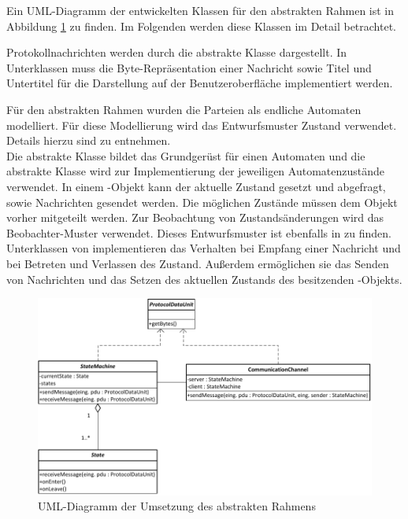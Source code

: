 Ein UML-Diagramm der entwickelten Klassen für den abstrakten Rahmen ist in Abbildung \ref{fig_uml_abstract_state_machine} zu finden. Im Folgenden werden diese Klassen im Detail betrachtet.

Protokollnachrichten werden durch die abstrakte Klasse  dargestellt. In Unterklassen muss die Byte-Repräsentation einer Nachricht sowie Titel und Untertitel für die Darstellung auf der Benutzeroberfläche implementiert werden.

Für den abstrakten Rahmen wurden die Parteien als endliche Automaten modelliert. Für diese Modellierung wird das Entwurfsmuster Zustand verwendet. Details hierzu sind \cite{freeman04} zu entnehmen.\\
Die abstrakte Klasse  bildet das Grundgerüst für einen Automaten und die abstrakte Klasse  wird zur Implementierung der jeweiligen Automatenzustände verwendet. In einem -Objekt kann der aktuelle Zustand gesetzt und abgefragt, sowie Nachrichten gesendet werden. Die möglichen Zustände müssen dem Objekt vorher mitgeteilt werden. Zur Beobachtung von Zustandsänderungen wird das Beobachter-Muster verwendet. Dieses Entwurfsmuster ist ebenfalls in \cite{freeman04} zu finden.\\
Unterklassen von  implementieren das Verhalten bei Empfang einer Nachricht und bei Betreten und Verlassen des Zustand. Außerdem ermöglichen sie das Senden von Nachrichten und das Setzen des aktuellen Zustands des besitzenden -Objekts.

\begin{figure}
	\centering
	\includegraphics[scale=0.9]{Diagrams/uml/abstract_pdu_state_machine_channel.pdf} %
	\caption{UML-Diagramm der Umsetzung des abstrakten Rahmens}
	\label{fig_uml_abstract_state_machine}
\end{figure}

